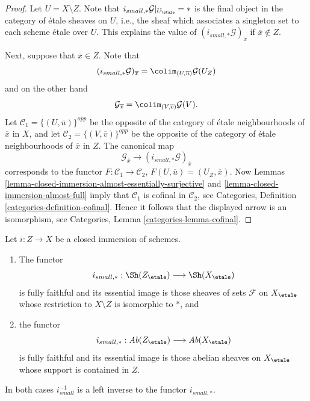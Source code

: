 \begin{proof}
Let $U = X \setminus Z$.
Note that $i_{small, *}\mathcal{G}|_{U_\etale} = *$ is the final
object in the category of \'etale sheaves on $U$, i.e., the sheaf
which associates a singleton set to each scheme \'etale over $U$.
This explains the value of $(i_{small, *}\mathcal{G})_{\overline{x}}$
if $\overline{x} \not \in Z$.

\medskip\noindent
Next, suppose that $\overline{x} \in Z$. Note that
$$
(i_{small, *}\mathcal{G})_{\overline{x}}
=
\colim_{(U, \overline{u})} \mathcal{G}(U_Z)
$$
and on the other hand
$$
\mathcal{G}_{\overline{x}}
=
\colim_{(V, \overline{v})} \mathcal{G}(V).
$$
Let $\mathcal{C}_1 = \{(U, \overline{u})\}^{opp}$ be the opposite of the
category of \'etale neighbourhoods of $\overline{x}$ in $X$, and let
$\mathcal{C}_2 = \{(V, \overline{v})\}^{opp}$ be the opposite of the
category of \'etale neighbourhoods of $\overline{x}$ in $Z$. The canonical map
$$
\mathcal{G}_{\overline{x}}
\longrightarrow
(i_{small, *}\mathcal{G})_{\overline{x}}
$$
corresponds to the functor $F : \mathcal{C}_1 \to \mathcal{C}_2$,
$F(U, \overline{u}) = (U_Z, \overline{x})$. Now
Lemmas \ref{lemma-closed-immersion-almost-essentially-surjective} and
\ref{lemma-closed-immersion-almost-full}
imply that $\mathcal{C}_1$ is cofinal in $\mathcal{C}_2$, see
Categories, Definition \ref{categories-definition-cofinal}.
Hence it follows that the displayed arrow is an isomorphism, see
Categories, Lemma \ref{categories-lemma-cofinal}.
\end{proof}

\begin{proposition}
\label{proposition-closed-immersion-pushforward}
Let $i : Z \to X$ be a closed immersion of schemes.
\begin{enumerate}
\item The functor
$$
i_{small, *} :
\Sh(Z_\etale)
\longrightarrow
\Sh(X_\etale)
$$
is fully faithful and its essential image is those sheaves of sets
$\mathcal{F}$ on $X_\etale$ whose restriction to $X \setminus Z$ is
isomorphic to $*$, and
\item the functor
$$
i_{small, *} :
\textit{Ab}(Z_\etale)
\longrightarrow
\textit{Ab}(X_\etale)
$$
is fully faithful and its essential image is those abelian sheaves on
$X_\etale$ whose support is contained in $Z$.
\end{enumerate}
In both cases $i_{small}^{-1}$ is a left inverse to the functor
$i_{small, *}$.
\end{proposition}

